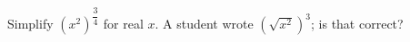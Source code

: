 Simplify $\left(x^2\right)^{\dfrac{3}{4}}$ for real $x$. A student wrote $\left(\sqrt{x^2}\right)^3$; is that correct?
